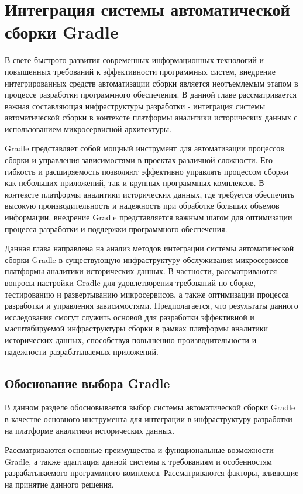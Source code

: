 \chapter{Интеграция системы автоматической сборки Gradle}

В свете быстрого развития современных информационных технологий и повышенных требований к
эффективности программных систем, внедрение интегрированных средств автоматизации сборки является
неотъемлемым этапом в процессе разработки программного обеспечения. В данной главе рассматривается
важная составляющая инфраструктуры разработки - интеграция системы автоматической сборки в
контексте платформы аналитики исторических данных с использованием микросервисной архитектуры.

Gradle представляет собой мощный инструмент для автоматизации процессов сборки и управления
зависимостями в проектах различной сложности. Его гибкость и расширяемость позволяют эффективно
управлять процессом сборки как небольших приложений, так и крупных программных комплексов. В
контексте платформы аналитики исторических данных, где требуется обеспечить высокую
производительность и надежность при обработке больших объемов информации, внедрение Gradle
представляется важным шагом для оптимизации процесса разработки и поддержки программного
обеспечения.

Данная глава направлена на анализ методов интеграции системы автоматической сборки Gradle
в существующую инфраструктуру обслуживания микросервисов платформы аналитики исторических данных. В
частности, рассматриваются вопросы настройки Gradle для удовлетворения требований по сборке,
тестированию и развертыванию микросервисов, а также оптимизации процесса разработки и управления
зависимостями.
Предполагается, что результаты данного исследования смогут служить основой для
разработки эффективной и масштабируемой инфраструктуры сборки в рамках платформы аналитики
исторических данных, способствуя повышению производительности и надежности разрабатываемых
приложений.


\section{Обоснование выбора Gradle}

В данном разделе обосновывается выбор системы автоматической сборки Gradle в качестве основного
инструмента для интеграции в инфраструктуру разработки на платформе аналитики исторических данных.

Рассматриваются основные преимущества и функциональные возможности Gradle, а также адаптация данной
системы к требованиям и особенностям разрабатываемого программного комплекса. Рассматриваются
факторы, влияющие на принятие данного решения.

